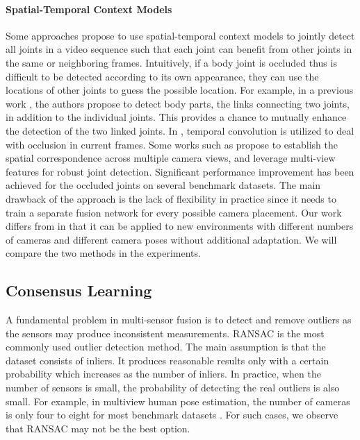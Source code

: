 \paragraph{Spatial-Temporal Context Models} Some approaches propose to use spatial-temporal context models to jointly detect all joints in a video sequence such that each joint can benefit from other joints in the same or neighboring frames. Intuitively, if a body joint is occluded thus is difficult to be detected according to its own appearance, they can use the locations of other joints to guess the possible location. For example, in a previous work \citep{cao2017realtime,kreiss2019pifpaf}, the authors propose to detect body parts, \ie the links connecting two joints, in addition to the individual joints. This provides a chance to mutually enhance the detection of the two linked joints. In \citep{cheng2019occlusion,pavllo20193d}, temporal convolution is utilized to deal with occlusion in current frames. Some works such as \citep{qiu2019cross} propose to establish the spatial correspondence across multiple camera views, and leverage multi-view features for robust joint detection. Significant performance improvement has been achieved for the occluded joints on several benchmark datasets. The main drawback of the approach \citep{qiu2019cross} is the lack of flexibility in practice since it needs to train a separate fusion network for every possible camera placement. Our work differs from \citep{qiu2019cross} in that it can be applied to new environments with different numbers of cameras and different camera poses without additional adaptation. We will compare the two methods in the experiments.




\subsection{Consensus Learning}
\label{sec:related_agreement}
A fundamental problem in multi-sensor fusion is to detect and remove outliers as the sensors may produce inconsistent measurements. RANSAC \citep{fischler1981random} is the most commonly used outlier detection method. The main assumption is that the dataset consists of inliers. It produces reasonable results only with a certain probability which increases as the number of inliers. In practice, when the number of sensors is small, the probability of detecting the real outliers is also small. For example, in multiview human pose estimation, the number of cameras is only four to eight for most benchmark datasets \citep{ionescu2014human3,trumble2017total}. For such cases, we observe that RANSAC may not be the best option.

